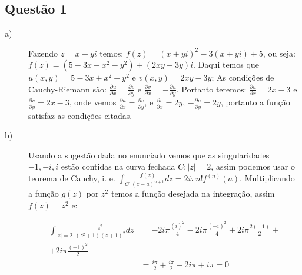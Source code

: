 \documentclass[12pt]{article}
\begin{document}
\subsection*{\color{red} Questão 1}

\begin{description}

\item[a)]  Fazendo $z=x+yi$ temos: $f(z)=(x+yi)^2-3(x+yi)+5$, ou seja: $f(z)=(5-3x+x^2-y^2)+(2xy-3y)i$. Daqui temos que $u(x,y)=5-3x+x^2-y^2$ e $v(x,y)=2xy-3y$; As condições de Cauchy-Riemann são: $\displaystyle \frac{\partial u}{\partial x}=\frac{\partial v}{\partial y}$ e $\displaystyle \frac{\partial v}{\partial x}=-\frac{\partial u}{\partial y}$. Portanto teremos: $\displaystyle \frac{\partial u}{\partial x}=2x-3$ e $\displaystyle \frac{\partial v}{\partial y}=2x-3$, onde vemos $\displaystyle \frac{\partial u}{\partial x}=\frac{\partial v}{\partial y}$, e $\displaystyle \frac{\partial v}{\partial x}=2y$, $\displaystyle-\frac{\partial u}{\partial y}=2y$, portanto a função satisfaz as condições citadas.

\item[b)] Usando a sugestão dada no enunciado vemos que as singularidades $-1, -i, i$ estão contidas na curva fechada $C:|z|=2$, assim podemos usar o teorema de Cauchy, i. e. $\displaystyle \int_C \frac{f(z)}{(z-a)^{n+1}} dz=2i\pi n!f^{(n)}(a)$. Multiplicando a função $g(z)$ por $z^2$ temos a função desejada na integração, assim $f(z)=z^2$ e: 

\begin{align*}
\int_{|z|=2}\frac{z^2}{(z^2+1)(z+1)^2}dz&=-2i\pi\frac{(i)^2}{4}-2i\pi\frac{(-i)^2}{4}+2i\pi\frac{2(-1)}{2}+\\
+2i\pi\frac{(-1)^2}{2}\\
&=\frac{i\pi}{2}+\frac{i\pi}{2}-2i\pi+i\pi=0
\end{align*}

\end{description}
\end{document}
